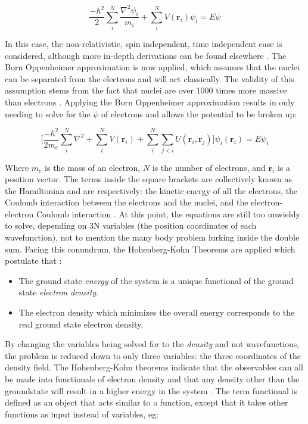 \begin{equation}
	\frac{-\hbar^2}{2} \sum_{i}^{N} \frac{\nabla^2 \psi_i}{m_i} + \sum_{i}^{N} V(\textbf{r}_i) \psi_i = E \psi
\end{equation}

In this case, the non-relativistic, spin independent, time independent case is considered, although more in-depth derivations can be found elsewhere \cite{tddft}. The Born Oppenheimer approximation is now applied, which assumes that the nuclei can be separated from the electrons and will act classically. The validity of this assumption stems from the fact that nuclei are over 1000 times more massive than electrons \cite{graff_direct_1980}.  Applying the Born Oppenheimer approximation results in only needing to solve for the $\psi$ of electrons and allows the potential to be broken up:

\begin{equation}
	\bigg[\frac{-\hbar^2}{2m_e}\sum_{i}^{N} \nabla^2 +\sum_{i}^{N} V(\textbf{r}_i) + \sum_{i}^{N}\sum_{j <i}U(\textbf{r}_i,\textbf{r}_j) \bigg] \psi_i(\textbf{r}_i) = E \psi_i
\end{equation}

Where $m_e$ is the mass of an electron, $N$ is the number of electrons, and $\textbf{r}_i$ is a position vector. The terms inside the square brackets are collectively known as the Hamiltonian and are respectively: the kinetic energy of all the electrons, the Coulomb interaction between the electrons and the nuclei, and the electron-electron Coulomb interaction  \cite{sholl_density_2009}. At this point, the equations are still too unwieldy to solve, depending on 3N variables (the position coordinates of each wavefunction), not to mention the many body problem lurking inside the double sum.  Facing this conundrum, the Hohenberg-Kohn Theorems are applied which postulate that \cite{hohenberg_inhomogeneous_1964}:
\begin{itemize}
	\item  The ground state \textit{energy} of the system is a unique functional of the ground state \textit{electron density}.
	\item The electron density which minimizes the overall energy corresponds to the real ground state electron density.  
\end{itemize}

By changing the variables being solved for to the \textit{density} and not wavefunctions, the problem is reduced down to only three variables: the three coordinates of the density field.  The Hohenberg-Kohn theorems indicate that the observables can all be made into functionals of electron density and that any density other than the groundstate will result in a higher energy in the system \cite{parr_density_1983}.  The term functional is defined as an object that acts similar to a function, except that it takes other functions as input instead of variables, eg:

